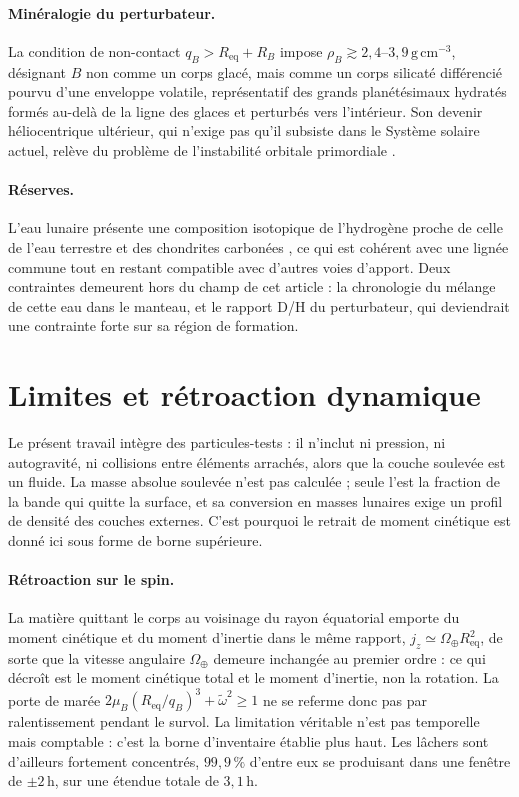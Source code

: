 \documentclass[11pt,a4paper]{article}
\begin{document}
\paragraph{Minéralogie du perturbateur.} La condition de non-contact $q_B > R_{\mathrm{eq}} + R_B$ impose $\rho_B \gtrsim 2{,}4$--$3{,}9\,\mathrm{g\,cm^{-3}}$, désignant $B$ non comme un corps glacé, mais comme un corps silicaté différencié pourvu d'une enveloppe volatile, représentatif des grands planétésimaux hydratés formés au-delà de la ligne des glaces et perturbés vers l'intérieur. Son devenir héliocentrique ultérieur, qui n'exige pas qu'il subsiste dans le Système solaire actuel, relève du problème de l'instabilité orbitale primordiale \cite{Nesvorny2011}.

\paragraph{Réserves.} L'eau lunaire présente une composition isotopique de l'hydrogène proche de celle de l'eau terrestre et des chondrites carbonées \cite{Saal2008, Saal2013}, ce qui est cohérent avec une lignée commune tout en restant compatible avec d'autres voies d'apport. Deux contraintes demeurent hors du champ de cet article : la chronologie du mélange de cette eau dans le manteau, et le rapport D/H du perturbateur, qui deviendrait une contrainte forte sur sa région de formation.

\section{Limites et rétroaction dynamique}

Le présent travail intègre des particules-tests : il n'inclut ni pression, ni autogravité, ni collisions entre éléments arrachés, alors que la couche soulevée est un fluide. La masse absolue soulevée n'est pas calculée ; seule l'est la fraction de la bande qui quitte la surface, et sa conversion en masses lunaires exige un profil de densité des couches externes. C'est pourquoi le retrait de moment cinétique est donné ici sous forme de borne supérieure.

\paragraph{Rétroaction sur le spin.} La matière quittant le corps au voisinage du rayon équatorial emporte du moment cinétique et du moment d'inertie dans le même rapport, $j_z \simeq \Omega_\oplus R_{\mathrm{eq}}^2$, de sorte que la vitesse angulaire $\Omega_\oplus$ demeure inchangée au premier ordre : ce qui décroît est le moment cinétique total et le moment d'inertie, non la rotation. La porte de marée $2\mu_B (R_{\mathrm{eq}}/q_B)^3 + \tilde{\omega}^2 \ge 1$ ne se referme donc pas par ralentissement pendant le survol. La limitation véritable n'est pas temporelle mais comptable : c'est la borne d'inventaire établie plus haut. Les lâchers sont d'ailleurs fortement concentrés, $99{,}9\,\%$ d'entre eux se produisant dans une fenêtre de $\pm 2\,\mathrm{h}$, sur une étendue totale de $3{,}1\,\mathrm{h}$.
\end{document}
